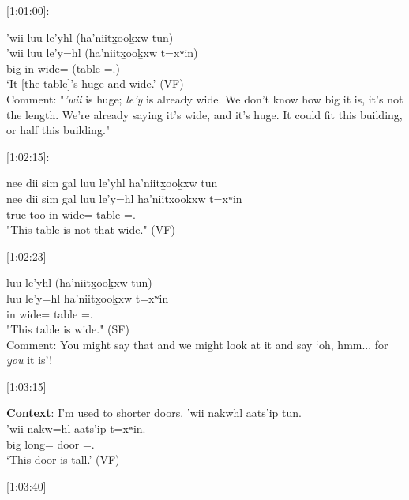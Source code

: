 [1:01:00]:
\begin{exe}
    \ex \glll 
    'wii luu le’yhl (ha'niitx̱ooḵxw tun) \\ 
    'wii luu le’y=hl (ha'niitx̱ooḵxw t=xʷin) \\ 
    big in wide=\Cn{} (table \Pn=\Dem.\Prox) \\
    \glt `It [the table]'s huge and wide.' (VF) \\
    Comment: "\textit{'wii} is huge; \textit{le’y} is already wide. We don't know how big it is, it's not the length. We're already saying it's wide, and it's huge. It could fit this building, or half this building."
\end{exe}

[1:02:15]:
\begin{exe}
    \ex \glll
    nee dii sim g̱al luu le'yhl ha'niitx̱ooḵxw tun \\
    nee dii sim g̱al luu le'y=hl ha'niitx̱ooḵxw t=xʷin \\
    \Neg{} \Foc{} true too in wide=\Cn{} table \Pn=\Dem.\Prox{} \\
    \glt "This table is not that wide." (VF)
\end{exe}

[1:02:23]
\begin{exe}
    \ex \glll 
    luu le’yhl (ha'niitx̱ooḵxw tun) \\ 
    luu le’y=hl ha'niitx̱ooḵxw t=xʷin \\
    in wide=\Cn{} table \Pn=\Dem.\Prox{} \\
    \glt "This table is wide." (SF) \\
    Comment: You might say that and we might look at it and say `oh, hmm... for \textit{you} it is'! 
\end{exe}

[1:03:15]
\begin{exe}
    \ex \textbf{Context}: I'm used to shorter doors. \glll
    'wii nakwhl aats'ip tun. \\
    'wii nakw=hl aats'ip t=xʷin. \\
    big long=\Cn{} door \Pn=\Dem.\Prox{} \\
    \glt `This door is tall.' (VF)
\end{exe}

[1:03:40]
\begin{exe}
\end{exe}

